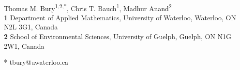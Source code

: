 \documentclass[10pt,letterpaper]{article}
\begin{document}
\vspace*{0.2in}

\begin{flushleft}
{\Large
\textbf{} %
}
\newline
\\
Thomas M. Bury\textsuperscript{1,2,*},
Chris T. Bauch\textsuperscript{1},
Madhur Anand\textsuperscript{2}
\\
\bigskip
\textbf{1} Department of Applied Mathematics, University of Waterloo, Waterloo, ON N2L 3G1, Canada
\\
\textbf{2} School of Environmental Sciences, University of Guelph, Guelph, ON N1G 2W1, Canada
\\
\bigskip

% 
%





* tbury@uwaterloo.ca

\end{flushleft}
\end{document}
